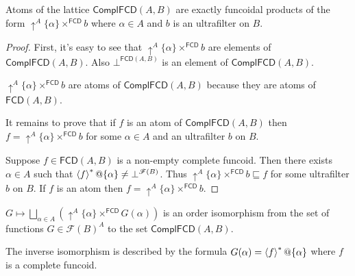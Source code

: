 \begin{thm}
Atoms of the lattice $\mathsf{ComplFCD}(A,B)$ are exactly funcoidal
products of the form $\uparrow^{A}\{\alpha\}\times^{\mathsf{FCD}}b$
where $\alpha\in A$ and $b$ is an ultrafilter on $B$.\end{thm}
\begin{proof}
First, it's easy to see that $\uparrow^{A}\{\alpha\}\times^{\mathsf{FCD}}b$
are elements of $\mathsf{ComplFCD}(A,B)$. Also $\bot^{\mathsf{FCD}(A,B)}$
is an element of $\mathsf{ComplFCD}(A,B)$.

$\uparrow^{A}\{\alpha\}\times^{\mathsf{FCD}}b$ are atoms of
$\mathsf{ComplFCD}(A,B)$
because they are atoms of $\mathsf{FCD}(A,B)$.

It remains to prove that if $f$ is an atom of $\mathsf{ComplFCD}(A,B)$
then $f=\uparrow^{A}\{\alpha\}\times^{\mathsf{FCD}}b$ for some $\alpha\in A$
and an ultrafilter $b$ on $B$.

Suppose $f\in\mathsf{FCD}(A,B)$ is a non-empty complete funcoid.
Then there exists $\alpha\in A$ such that $\left\langle f\right\rangle ^{\ast}@\{\alpha\}\ne\bot^{\mathscr{F}(B)}$.
Thus $\uparrow^{A}\{\alpha\}\times^{\mathsf{FCD}}b\sqsubseteq f$
for some ultrafilter $b$ on $B$. If $f$ is an atom then
$f=\uparrow^{A}\{\alpha\}\times^{\mathsf{FCD}}b$.\end{proof}
\begin{thm}
\label{complfcd-rep}$G\mapsto\bigsqcup_{\alpha\in
A}(\uparrow^{A}\{\alpha\}\times^{\mathsf{FCD}}G(\alpha))$
is an order isomorphism from the set of functions $G\in\mathscr{F}(B)^{A}$
to the set $\mathsf{ComplFCD}(A,B)$.

The inverse isomorphism is described by the formula $G(\alpha)=\left\langle f\right\rangle ^{\ast}@\{\alpha\}$
where $f$ is a complete funcoid.\end{thm}
